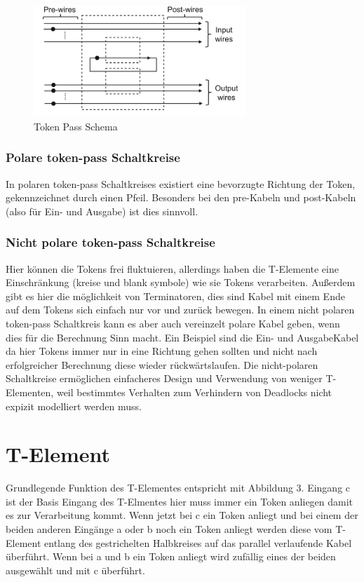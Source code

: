 \documentclass[11pt,a4paper]{article}
\begin{document}
\begin{figure}[h]
    \centering
    \includegraphics[width=8cm]{bilder/TokenPassScheme.png}
    \caption{Token Pass Schema}
\end{figure} 

\subsubsection{Polare token-pass Schaltkreise}
In polaren token-pass Schaltkreises existiert eine bevorzugte Richtung
der Token, gekennzeichnet durch einen Pfeil.
%
Besonders bei den pre-Kabeln und post-Kabeln (also für Ein- und Ausgabe)
ist dies sinnvoll.

\subsubsection{Nicht polare token-pass Schaltkreise}
Hier können die Tokens frei fluktuieren, allerdings haben die T-Elemente eine
Einschränkung (kreise und blank symbole) wie sie Tokens verarbeiten.
%
Außerdem gibt es hier die möglichkeit von Terminatoren, dies sind Kabel
mit einem Ende auf dem Tokens sich einfach nur vor und zurück bewegen.
%
In einem nicht polaren token-pass Schaltkreis kann es aber auch vereinzelt
polare Kabel geben, wenn dies für die Berechnung Sinn macht.
%
Ein Beispiel sind die Ein- und AusgabeKabel da hier Tokens immer nur in eine 
Richtung gehen sollten und nicht nach erfolgreicher Berechnung diese 
wieder rückwärtslaufen.
%
Die nicht-polaren Schaltkreise ermöglichen einfacheres Design und Verwendung
von weniger T-Elementen, weil bestimmtes Verhalten zum Verhindern von
Deadlocks nicht expizit modelliert werden muss.

\section{T-Element}
Grundlegende Funktion des T-Elementes entspricht mit Abbildung 3.
%
Eingang c ist der Basis Eingang des T-Elmentes hier muss immer ein Token
anliegen damit es zur Verarbeitung kommt.
%
Wenn jetzt bei c ein Token anliegt und bei einem der beiden anderen
Eingänge a oder b noch ein Token anliegt werden diese vom T-Element 
entlang des gestrichelten Halbkreises auf das parallel verlaufende 
Kabel überführt.
%
Wenn bei a und b ein Token anliegt wird zufällig 
eines der beiden ausgewählt und mit c überführt.
\end{document}
